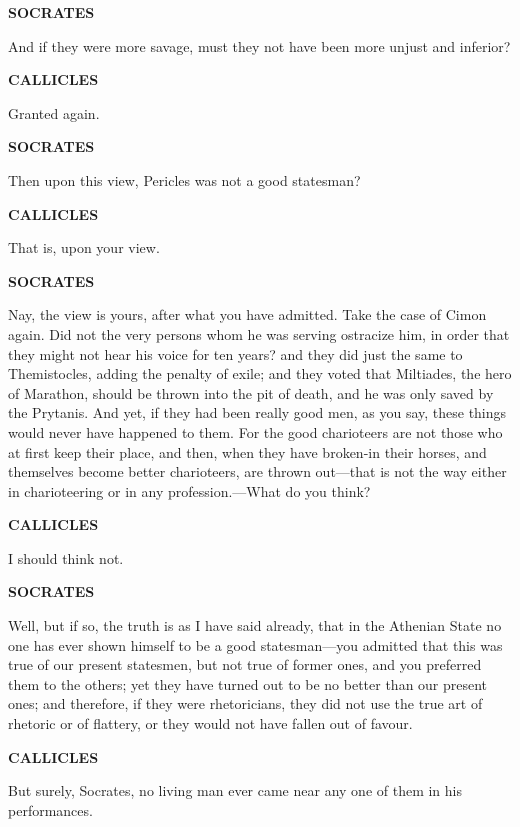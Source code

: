 \documentclass[11pt,letter]{article}
\begin{document}
\par \textbf{SOCRATES}
\par   And if they were more savage, must they not have been more unjust and inferior?

\par \textbf{CALLICLES}
\par   Granted again.

\par \textbf{SOCRATES}
\par   Then upon this view, Pericles was not a good statesman?

\par \textbf{CALLICLES}
\par   That is, upon your view.

\par \textbf{SOCRATES}
\par   Nay, the view is yours, after what you have admitted. Take the case of Cimon again. Did not the very persons whom he was serving ostracize him, in order that they might not hear his voice for ten years? and they did just the same to Themistocles, adding the penalty of exile; and they voted that Miltiades, the hero of Marathon, should be thrown into the pit of death, and he was only saved by the Prytanis. And yet, if they had been really good men, as you say, these things would never have happened to them. For the good charioteers are not those who at first keep their place, and then, when they have broken-in their horses, and themselves become better charioteers, are thrown out—that is not the way either in charioteering or in any profession.—What do you think?

\par \textbf{CALLICLES}
\par   I should think not.

\par \textbf{SOCRATES}
\par   Well, but if so, the truth is as I have said already, that in the Athenian State no one has ever shown himself to be a good statesman—you admitted that this was true of our present statesmen, but not true of former ones, and you preferred them to the others; yet they have turned out to be no better than our present ones; and therefore, if they were rhetoricians, they did not use the true art of rhetoric or of flattery, or they would not have fallen out of favour.

\par \textbf{CALLICLES}
\par   But surely, Socrates, no living man ever came near any one of them in his performances.
\end{document}
